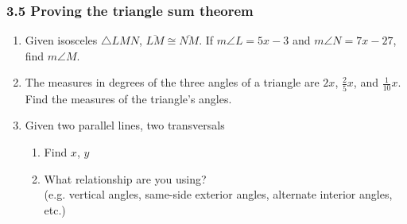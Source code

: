 

\fancyhead[LE]{\thepage}



\subsubsection*{3.5 Proving the triangle sum theorem}
\begin{enumerate}
  \item Given isosceles $\triangle LMN$, $\overline{LM} \cong \overline{NM}$. If $m\angle L=5x-3$ and $m\angle N=7x-27$, find $m\angle M$.
  \begin{flushright}
  \end{flushright} \vspace{2cm}

\item The measures in degrees of the three angles of a triangle are $2x$, $\frac{2}{5}x$, and $\frac{1}{10}x$. Find the measures of the triangle's angles. \vspace{4cm}

\item Given two parallel lines, two transversals
\begin{multicols}{2}
  \begin{enumerate}
    \item Find $x$, $y$
    \item What relationship are you using? \\[0.5cm]
    (e.g. vertical angles, same-side exterior angles, alternate interior angles, etc.)
  \end{enumerate}
\end{multicols}


\end{enumerate}
